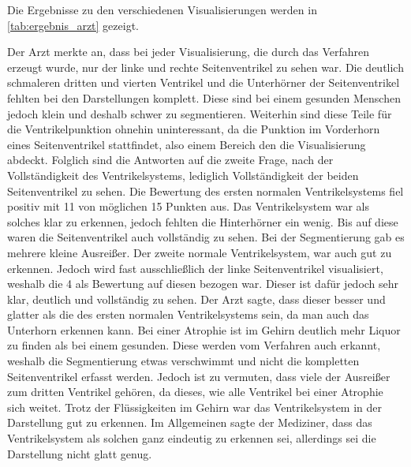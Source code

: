 Die Ergebnisse zu den verschiedenen Visualisierungen werden in \autoref{tab:ergebnis_arzt} gezeigt.

\begin{table}[h]
\centering
{}
\caption{Ergebnisse des Interviews mit einem Arzt}
\label{tab:ergebnis_arzt}
\end{table}



Der Arzt merkte an, dass bei jeder Visualisierung, die durch das Verfahren erzeugt wurde, nur der linke und rechte Seitenventrikel zu sehen war. Die deutlich schmaleren dritten und vierten Ventrikel und die Unterhörner der Seitenventrikel fehlten bei den Darstellungen komplett. Diese sind bei einem gesunden Menschen jedoch klein und deshalb schwer zu segmentieren. Weiterhin sind diese Teile für die Ventrikelpunktion ohnehin uninteressant, da die Punktion im Vorderhorn eines Seitenventrikel stattfindet, also einem Bereich den die Visualisierung abdeckt. Folglich sind die Antworten auf die zweite Frage, nach der Vollständigkeit des Ventrikelsystems, lediglich Vollständigkeit der beiden Seitenventrikel zu sehen.
\newline
Die Bewertung des ersten normalen Ventrikelsystems fiel positiv mit 11 von möglichen 15 Punkten aus. Das Ventrikelsystem war als solches klar zu erkennen, jedoch fehlten die Hinterhörner ein wenig. Bis auf diese waren die Seitenventrikel auch vollständig zu sehen. Bei der Segmentierung gab es mehrere kleine Ausreißer.
\newline
Der zweite normale Ventrikelsystem, war auch gut zu erkennen. Jedoch wird fast ausschließlich der linke Seitenventrikel visualisiert, weshalb die 4 als Bewertung auf diesen bezogen war. Dieser ist dafür jedoch sehr klar, deutlich und vollständig zu sehen. Der Arzt sagte, dass dieser besser und glatter als die des ersten normalen Ventrikelsystems sein, da man auch das Unterhorn erkennen kann. 
\newline
Bei einer Atrophie ist im Gehirn deutlich mehr Liquor zu finden als bei einem gesunden. Diese werden vom Verfahren auch erkannt, weshalb die Segmentierung etwas verschwimmt und nicht die kompletten Seitenventrikel erfasst werden. Jedoch ist zu vermuten, dass viele der Ausreißer zum dritten Ventrikel gehören, da dieses, wie alle Ventrikel bei einer Atrophie sich weitet. Trotz der Flüssigkeiten im Gehirn war das Ventrikelsystem in der Darstellung gut zu erkennen.
\newline
 Im Allgemeinen sagte der Mediziner, dass das Ventrikelsystem als solchen ganz eindeutig zu erkennen sei, allerdings sei die Darstellung nicht glatt genug.


